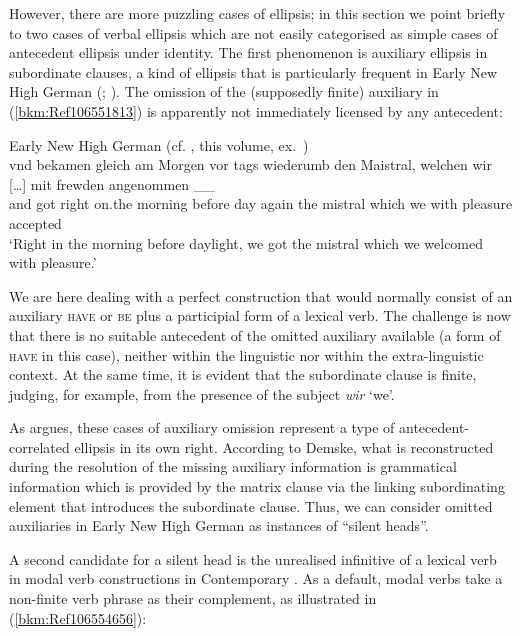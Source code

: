 \documentclass[output=paper
  ,nobabel
  ,draftmode
  ,colorlinks, citecolor=brown
]{langscibook}
\begin{document}
However, there are more puzzling cases of ellipsis; in this section we point briefly to two cases of
verbal ellipsis which are not easily categorised as simple cases of antecedent ellipsis under
identity. The first phenomenon is auxiliary ellipsis in subordinate clauses, a kind of ellipsis that
is particularly frequent in Early New High German (\citealt{demske90};
\citealt{Breitbarth2005}). The omission of the (supposedly finite) auxiliary in
(\ref{bkm:Ref106551813}) is apparently not immediately licensed by any antecedent:



\ea
\label{bkm:Ref106551813}Early New High German (cf. \citealt{chapters/demske}, this volume, ex.\ )\\
\gll   vnd  bekamen gleich am     Morgen  vor    tags wiederumb den Maistral, welchen wir [\ldots] mit  frewden  angenommen  \_\_\\
       and  got     right  on.the morning before day  again     the mistral   which   we  {}       with pleasure accepted\\
\glt   `Right in the morning before daylight, we got the mistral which we welcomed with pleasure.'
\z

\noindent
We are here dealing with a perfect construction that would normally consist of an auxiliary
\textsc{have} or \textsc{be} plus a participial form of a lexical verb. The challenge is now that
there is no suitable antecedent of the omitted auxiliary available (a form of \textsc{have} in this
case), neither within the linguistic nor within the extra-linguistic context. At the same time, it
is evident that the subordinate clause is finite, judging, for example, from the presence of the
subject \emph{wir} `we'.

As \citet{chapters/demske} argues, these cases of auxiliary omission represent a type of
antecedent-correlated ellipsis in its own right. According to Demske, what is reconstructed during
the resolution of the missing auxiliary information is grammatical information which is provided by
the matrix clause via the linking subordinating element that introduces the subordinate
clause. Thus, we can consider omitted auxiliaries in Early New High German as instances of ``silent
heads''.

A second candidate for a silent head is the unrealised infinitive of a lexical verb in modal verb
constructions in Contemporary . As a default, modal verbs take a non-finite verb phrase as
their complement, as illustrated in (\ref{bkm:Ref106554656}):
\end{document}
